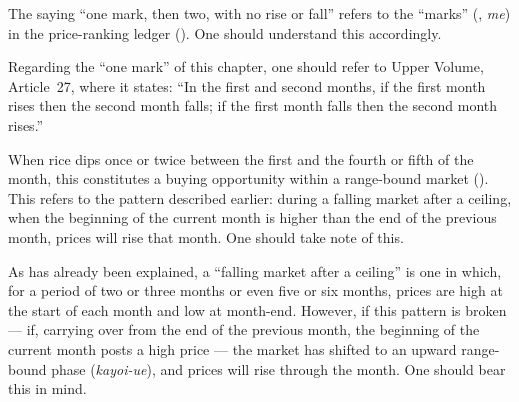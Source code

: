 \begin{sokyubox}
{\small\itshape\color{sokyubar} }

\medskip
The saying ``one mark, then two, with no rise or fall'' refers to the
``marks'' (, \textit{me}) in the price-ranking ledger
(). One should understand this accordingly.
\end{sokyubox}

\commentary
Regarding the ``one mark'' of this chapter, one should refer to Upper
Volume, Article~27, where it states: ``In the first and second months,
if the first month rises then the second month falls; if the first
month falls then the second month rises.''


\begin{sokyubox}
{\small\itshape\color{sokyubar} }

\medskip
When rice dips once or twice between the first and the fourth or
fifth of the month, this constitutes a buying opportunity within a
range-bound market (). This refers to the pattern
described earlier: during a falling market after a ceiling, when the
beginning of the current month is higher than the end of the previous
month, prices will rise that month. One should take note of this.
\end{sokyubox}

\commentary
As has already been explained, a ``falling market after a ceiling''
is one in which, for a period of two or three months or even five
or six months, prices are high at the start of each month and low at
month-end. However, if this pattern is broken --- if, carrying over
from the end of the previous month, the beginning of the current
month posts a high price --- the market has shifted to an upward
range-bound phase (\textit{kayoi-ue}), and prices will rise through the
month. One should bear this in mind.


